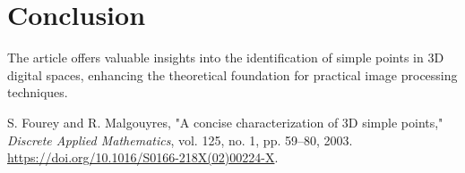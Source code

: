 \documentclass{llncs}
\begin{document}
\section{Conclusion}
The article offers valuable insights into the identification of simple points in 3D digital spaces, enhancing the theoretical foundation for practical image processing techniques.

\begin{thebibliography}{1}

S. Fourey and R. Malgouyres, 
"A concise characterization of 3D simple points," 
\textit{Discrete Applied Mathematics}, 
vol. 125, no. 1, pp. 59–80, 2003. 
\url{https://doi.org/10.1016/S0166-218X(02)00224-X}.

\end{thebibliography}
\end{document}
